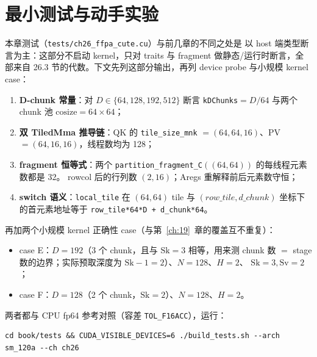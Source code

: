 \section{最小测试与动手实验}

本章测试（\texttt{tests/\allowbreak{}ch26\_\allowbreak{}ffpa\_\allowbreak{}cute.\allowbreak{}cu}）与前几章的不同之处是
以 host 端类型断言为主：这部分不启动 kernel，只对 traits 与 fragment
做静态/运行时断言，全部来自 26.3 节的代数。下文先列这部分输出，再列 device
probe 与小规模 kernel case：

\begin{enumerate}[itemsep=2pt,topsep=2pt]
  \item \textbf{D-chunk 常量}：对 $D\in\{64,128,192,512\}$ 断言
        \texttt{kDChunks}$=D/64$ 与两个 chunk 池
        $\mathrm{cosize}=64\times64$；
  \item \textbf{双 TiledMma 推导链}：QK 的 \texttt{tile\_\allowbreak{}size\_\allowbreak{}mnk}
        $=(64,64,16)$、PV $=(64,16,16)$，线程数均为 128；
  \item \textbf{fragment 恒等式}：两个
        \texttt{partition\_\allowbreak{}fragment\_\allowbreak{}C}$((64,64))$ 的每线程元素数都是 32。
        rowcol 后的行列数 $(2,16)$；Aregs 重解释前后元素数守恒；
  \item \textbf{switch 语义}：\texttt{local\_tile} 在 $(64,64)$ tile 与
        $(row\_tile, d\_chunk)$ 坐标下的首元素地址等于
        \texttt{row\_\allowbreak{}tile*64*D + d\_\allowbreak{}chunk*64}。
\end{enumerate}

再加两个小规模 kernel 正确性 case（与第~\ref{ch:19}~章的覆盖互不重复）：

\begin{itemize}[itemsep=2pt,topsep=2pt]
  \item case E：$D=192$（3 个 chunk，且与 $\mathrm{Sk}{=}3$ 相等，用来测
        chunk 数 $=$ stage 数的边界；实际预取深度为 $\mathrm{Sk}-1=2$）、$N=128$、$H=2$、
        $\mathrm{Sk}{=}3,\mathrm{Sv}{=}2$；
  \item case F：$D=128$（2 个 chunk，$\mathrm{Sk}{=}2$）、$N=128$、$H=2$。
\end{itemize}

两者都与 CPU fp64 参考对照（容差 \texttt{TOL\_F16ACC}），运行：

\begin{lstlisting}[style=console]
cd book/tests && CUDA_VISIBLE_DEVICES=6 ./build_tests.sh --arch sm_120a --ch ch26
\end{lstlisting}

